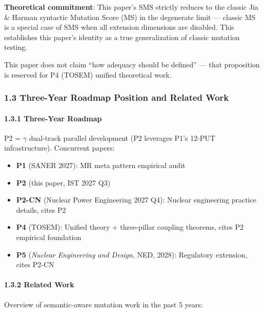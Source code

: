 \documentclass[review,12pt,authoryear]{elsarticle}
\providecommand{\tightlist}{\setlength{\itemsep}{0pt}\setlength{\parskip}{0pt}}
\begin{document}
\textbf{Theoretical commitment}: This paper's SMS strictly reduces to
the classic Jia \& Harman syntactic Mutation Score (MS) in the
degenerate limit --- classic MS is a special case of SMS when all
extension dimensions are disabled. This establishes this paper's
identity as a true generalization of classic mutation testing.

This paper does not claim ``how adequacy should be defined'' --- that
proposition is reserved for P4 (TOSEM) unified theoretical work.

\subsubsection{1.3 Three-Year Roadmap Position and Related
Work}\label{three-year-roadmap-position-and-related-work}

\paragraph{1.3.1 Three-Year Roadmap}\label{three-year-roadmap}

P2 = $\gamma$ dual-track parallel development (P2 leverages P1's 12-PUT
infrastructure). Concurrent papers:

\begin{itemize}
\tightlist
\item
  \textbf{P1} (SANER 2027): MR meta pattern empirical audit
\item
  \textbf{P2} (this paper, IST 2027 Q3)
\item
  \textbf{P2-CN} (Nuclear Power Engineering 2027 Q4): Nuclear
  engineering practice details, cites P2
\item
  \textbf{P4} (TOSEM): Unified theory + three-pillar coupling theorems,
  cites P2 empirical foundation
\item
  \textbf{P5} (\emph{Nuclear Engineering and Design}, NED, 2028):
  Regulatory extension, cites P2-CN
\end{itemize}

\paragraph{1.3.2 Related Work}\label{related-work}

Overview of semantic-aware mutation work in the past 5 years:
\end{document}
